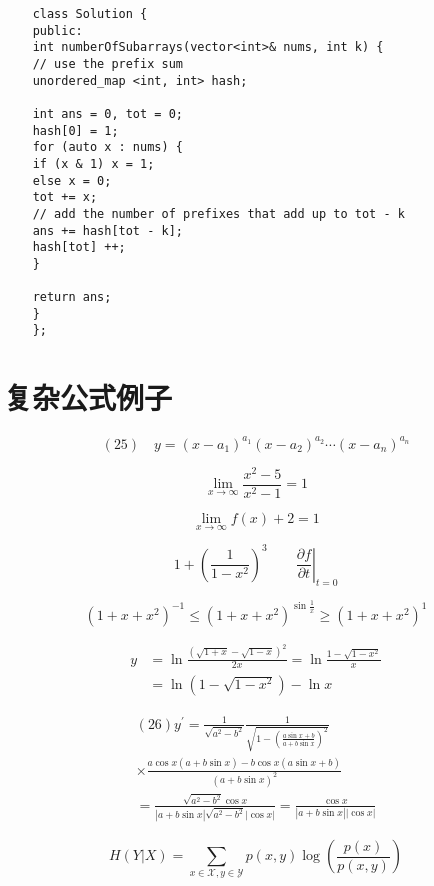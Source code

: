 \documentclass{article}
\begin{document}
    \begin{verbatim}
    class Solution {
    public:
    int numberOfSubarrays(vector<int>& nums, int k) {
    // use the prefix sum
    unordered_map <int, int> hash;

    int ans = 0, tot = 0;
    hash[0] = 1;
    for (auto x : nums) {
    if (x & 1) x = 1;
    else x = 0;
    tot += x;
    // add the number of prefixes that add up to tot - k
    ans += hash[tot - k]; 
    hash[tot] ++;
    }

    return ans;
    }
    };

    \end{verbatim}


    \section{复杂公式例子}
    \[
    (25)\quad y=\left(x-a_{1}\right)^{a_{1}}\left(x-a_{2}\right)^{a_{2}} \cdots\left(x-a_{n}\right)^{a_{n}}
    \]

    \[
    \lim _{x \rightarrow \infty} \frac{x^{2}-5}{x^{2}-1}=1
    \]

    $$\lim _{x \rightarrow \infty} {f(x)+ 2} = 1$$

    \[
    1 + \left(\frac{1}{1-x^{2}}\right)^3 \qquad
    \left. \frac{\partial f}{\partial t}
    \right|_{t = 0}
    \]

    \[(1 + x + x^2)^{-1} \leqslant (1 + x + x^2)^{\sin\frac{1}{x}} \geqslant (1+x+x^2)^{1}\] %

    \[
    \begin{aligned} y &=\ln \frac{(\sqrt{1+x}-\sqrt{1-x})^{2}}{2 x}=\ln \frac{1-\sqrt{1-x^{2}}}{x} \\ &=\ln (1-\sqrt{1-x^{2}})-\ln x \end{aligned}
    \]


    \[
    \begin{array}{l}{(26) y^{\prime}=\frac{1}{\sqrt{a^{2}-b^{2}}} \frac{1}{\sqrt{1-\left(\frac{a \sin x+b}{a+b \sin x}\right)^{2}}}} \\ {\times \frac{a \cos x(a+b \sin x)-b \cos x(a \sin x+b)}{(a+b \sin x)^{2}}} \\ {=\frac{\sqrt{a^{2}-b^{2}} \cos x}{|a+b \sin x| \sqrt{a^{2}-b^{2}}|\cos x|}=\frac{\cos x}{|a+b \sin x||\cos x|}}\end{array}
    \]

    \[
    H(Y | X)=\sum_{x \in \mathcal{X}, y \in \mathcal{Y}} p(x, y) \log \left(\frac{p(x)}{p(x, y)}\right)
    \]
\end{document}
